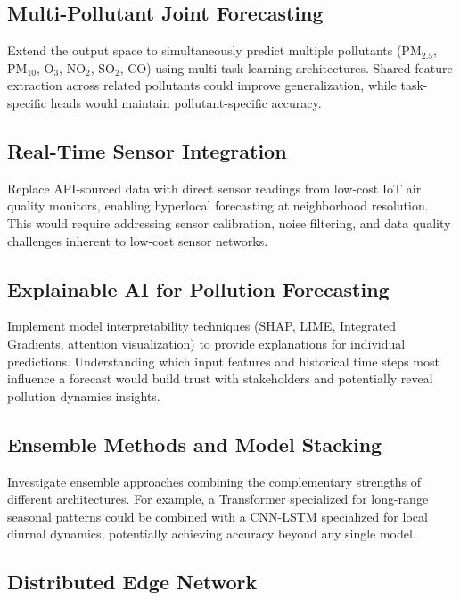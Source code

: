 \subsection{Multi-Pollutant Joint Forecasting}

Extend the output space to simultaneously predict multiple pollutants (PM$_{2.5}$, PM$_{10}$, O$_3$, NO$_2$, SO$_2$, CO) using multi-task learning architectures. Shared feature extraction across related pollutants could improve generalization, while task-specific heads would maintain pollutant-specific accuracy.

\subsection{Real-Time Sensor Integration}

Replace API-sourced data with direct sensor readings from low-cost IoT air quality monitors, enabling hyperlocal forecasting at neighborhood resolution. This would require addressing sensor calibration, noise filtering, and data quality challenges inherent to low-cost sensor networks.

\subsection{Explainable AI for Pollution Forecasting}

Implement model interpretability techniques (SHAP, LIME, Integrated Gradients, attention visualization) to provide explanations for individual predictions. Understanding which input features and historical time steps most influence a forecast would build trust with stakeholders and potentially reveal pollution dynamics insights.

\subsection{Ensemble Methods and Model Stacking}

Investigate ensemble approaches combining the complementary strengths of different architectures. For example, a Transformer specialized for long-range seasonal patterns could be combined with a CNN-LSTM specialized for local diurnal dynamics, potentially achieving accuracy beyond any single model.

\subsection{Distributed Edge Network}

